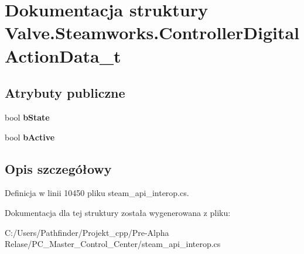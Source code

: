 \hypertarget{struct_valve_1_1_steamworks_1_1_controller_digital_action_data__t}{}\section{Dokumentacja struktury Valve.\+Steamworks.\+Controller\+Digital\+Action\+Data\+\_\+t}
\label{struct_valve_1_1_steamworks_1_1_controller_digital_action_data__t}
\subsection*{Atrybuty publiczne}
\begin{DoxyCompactItemize}
\item 
\mbox{\label{struct_valve_1_1_steamworks_1_1_controller_digital_action_data__t_ac8082ba53481b0bb993b6f49d1d63f00}} 
bool {\bfseries b\+State}
\item 
\mbox{\label{struct_valve_1_1_steamworks_1_1_controller_digital_action_data__t_afc7cef5cd6ebdbb603e224981f36ca85}} 
bool {\bfseries b\+Active}
\end{DoxyCompactItemize}


\subsection{Opis szczegółowy}


Definicja w linii 10450 pliku steam\+\_\+api\+\_\+interop.\+cs.



Dokumentacja dla tej struktury została wygenerowana z pliku\+:\begin{DoxyCompactItemize}
\item 
C\+:/\+Users/\+Pathfinder/\+Projekt\+\_\+cpp/\+Pre-\/\+Alpha Relase/\+P\+C\+\_\+\+Master\+\_\+\+Control\+\_\+\+Center/steam\+\_\+api\+\_\+interop.\+cs\end{DoxyCompactItemize}
